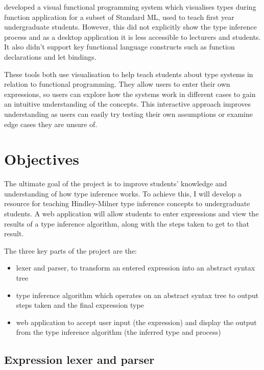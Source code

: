 \documentclass[a4paper,fleqn,12pt]{article}
\begin{document}
\cite{ref10} developed a visual functional programming system which visualises types during function application for a subset of Standard ML, used to teach first year undergraduate students. However, this did not explicitly show the type inference process and as a desktop application it is less accessible to lecturers and students. It also didn’t support key functional language constructs such as function declarations and let bindings.

These tools both use visualisation to help teach students about type systems in relation to functional programming. They allow users to enter their own expressions, so users can explore how the systems work in different cases to gain an intuitive understanding of the concepts. This interactive approach improves understanding as users can easily try testing their own assumptions or examine edge cases they are unsure of.

\section{Objectives}\label{id:h.qre9waa7e9so}

The ultimate goal of the project is to improve students’ knowledge and understanding of how type inference works. To achieve this, I will develop a resource for teaching Hindley-Milner type inference concepts to undergraduate students. A web application will allow students to enter expressions and view the results of a type inference algorithm, along with the steps taken to get to that result.

The three key parts of the project are the:

\begin{itemize}
  \item lexer and parser, to transform an entered expression into an abstract syntax tree
  \item type inference algorithm which operates on an abstract syntax tree to output steps taken and the final expression type
  \item web application to accept user input (the expression) and display the output from the type inference algorithm (the inferred type and process)
\end{itemize}

\subsection{Expression lexer and parser}\label{id:h.v6vafhv28y3i}
\end{document}
